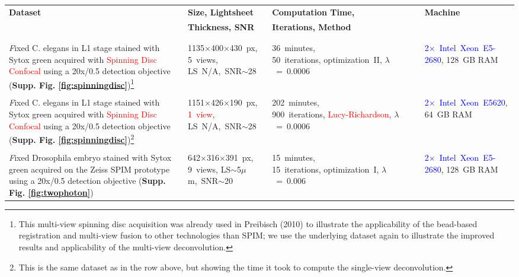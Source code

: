 \documentclass[]{spie}  %
\begin{document}
\begin{savenotes}
\begin{table}[h!]
\center
{
\fontsize{9pt}{10pt}\selectfont
\center
\begin{tabular}{p{5.5cm}p{3.0cm}p{3.6cm}p{3.5cm}}
\textbf{Dataset} & \textbf{Size, Lightsheet} & \textbf{Computation Time,} & \textbf{Machine}\\
 & \textbf{Thickness, SNR}  &\textbf{Iterations, Method} &  \\
\\
\hline
\\
\emph Fixed {C. elegans} in L1 stage stained with Sytox green acquired with \textcolor{red}{Spinning Disc Confocal} using a 20x/0.5 detection objective (\textbf{Supp. Fig. \ref{fig:spinningdisc}})\footnote{This multi-view spinning disc acquisition was already used in Preibisch (2010)\cite{Preibisch2010} to illustrate the applicability of the bead-based registration and multi-view fusion to other technologies than SPIM; we use the underlying dataset again to illustrate the improved results and applicability of the multi-view deconvolution.} & \mbox{1135$\times$400$\times$430~px}, \mbox{5~views}, \mbox{LS N/A, SNR$\sim$28} & \mbox{36 minutes,~~~~~~~~~~~~~~~~} \mbox{50 iterations}, \mbox{optimization II}, $\lambda$~=~0.0006 & \mbox{\textcolor{blue}{2$\times$~Intel~Xeon E5-2680}}, 128~GB RAM\\
\\
\emph Fixed {C. elegans} in L1 stage stained with Sytox green acquired with \textcolor{red}{Spinning Disc Confocal} using a 20x/0.5 detection objective (\textbf{Supp. Fig. \ref{fig:spinningdisc}})\footnote{This is the same dataset as in the row above, but showing the time it took to compute the single-view deconvolution.} & \mbox{1151$\times$426$\times$190~px}, \textcolor{red}{\mbox{1~view}}, \mbox{LS N/A, SNR$\sim$28} & \mbox{202 minutes,~~~~~~~~~~~~~~~~} \mbox{900 iterations}, \textcolor{red}{\mbox{Lucy-Richardson}}, $\lambda$~=~0.0006 & \mbox{\textcolor{blue}{2$\times$~Intel~Xeon E5620}}, 64~GB RAM\\
\\
\emph Fixed {Drosophila} embryo stained with Sytox green acquired on the Zeiss SPIM prototype using a 20x/0.5 detection objective (\textbf{Supp. Fig. \ref{fig:twophoton}}) & \mbox{642$\times$316$\times$391~px}, \mbox{9~views}, \mbox{LS$\sim$5$\mu$m, SNR$\sim$20} & \mbox{15 minutes,~~~~~~~~~~~~~~~~} \mbox{15 iterations}, \mbox{optimization I}, $\lambda$~=~0.006 & \mbox{\textcolor{blue}{2$\times$~Intel~Xeon E5-2680}}, 128~GB RAM\\

\end{tabular}}
\end{table}
\end{savenotes}
\end{document}
